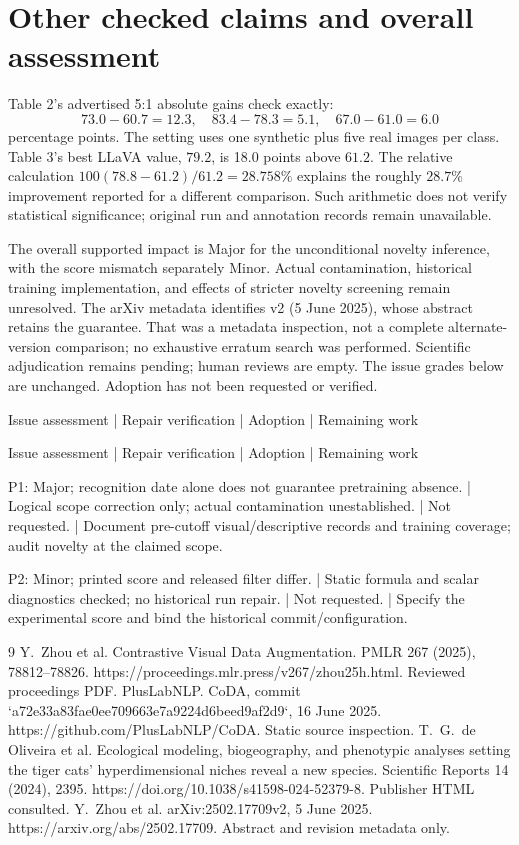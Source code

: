 \documentclass[10pt]{article}
\begin{document}
\section*{Other checked claims and overall assessment}
Table 2’s advertised 5:1 absolute gains check exactly: \[73.0-60.7=12.3,\quad83.4-78.3=5.1,\quad67.0-61.0=6.0\] percentage points. The setting uses one synthetic plus five real images per class. Table 3’s best LLaVA value, \(79.2\), is 18.0 points above \(61.2\). The relative calculation \(100(78.8-61.2)/61.2=28.758\%\) explains the roughly \(28.7\%\) improvement reported for a different comparison. Such arithmetic does not verify statistical significance; original run and annotation records remain unavailable.\par
The overall supported impact is Major for the unconditional novelty inference, with the score mismatch separately Minor. Actual contamination, historical training implementation, and effects of stricter novelty screening remain unresolved. The arXiv metadata identifies v2 (5 June 2025), whose abstract retains the guarantee. That was a metadata inspection, not a complete alternate-version comparison; no exhaustive erratum search was performed. Scientific adjudication remains pending; human reviews are empty. The issue grades below are unchanged. Adoption has not been requested or verified.\par
Issue assessment | Repair verification | Adoption | Remaining work\par
Issue assessment | Repair verification | Adoption | Remaining work\par
P1: Major; recognition date alone does not guarantee pretraining absence. | Logical scope correction only; actual contamination unestablished. | Not requested. | Document pre-cutoff visual/descriptive records and training coverage; audit novelty at the claimed scope.\par
P2: Minor; printed score and released filter differ. | Static formula and scalar diagnostics checked; no historical run repair. | Not requested. | Specify the experimental score and bind the historical commit/configuration.\par
9 Y. Zhou et al. Contrastive Visual Data Augmentation. PMLR 267 (2025), 78812–78826. https://proceedings.mlr.press/v267/zhou25h.html. Reviewed proceedings PDF. PlusLabNLP. CoDA, commit `a72e33a83fae0ee709663e7a9224d6beed9af2d9`, 16 June 2025. https://github.com/PlusLabNLP/CoDA. Static source inspection. T. G. de Oliveira et al. Ecological modeling, biogeography, and phenotypic analyses setting the tiger cats’ hyperdimensional niches reveal a new species. Scientific Reports 14 (2024), 2395. https://doi.org/10.1038/s41598-024-52379-8. Publisher HTML consulted. Y. Zhou et al. arXiv:2502.17709v2, 5 June 2025. https://arxiv.org/abs/2502.17709. Abstract and revision metadata only.\par
\end{document}
